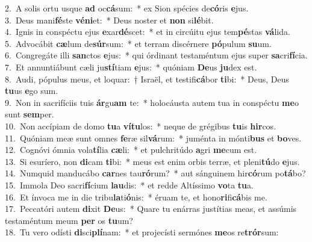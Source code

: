 {2.~}A solis ortu usque \textbf{ad} oc\textbf{cá}sum:~* ex Sion spécies de\textbf{có}ris \textbf{e}jus.\\
{3.~}Deus mani\textbf{fé}ste \textbf{vé}\textbf{ni}et:~* Deus noster et \textbf{non} si\textbf{lé}bit.\\
{4.~}Ignis in conspéctu ejus \textbf{e}xar\textbf{dé}scet:~* et in circúitu ejus tem\textbf{pé}stas \textbf{vá}lida.\\
{5.~}Advocábit \textbf{cæ}lum de\textbf{súr}sum:~* et terram discérnere \textbf{pó}pulum \textbf{su}um.\\
{6.~}Congregáte illi \textbf{san}ctos \textbf{e}jus:~* qui órdinant testaméntum ejus super \textbf{sa}cri\textbf{fí}cia.\\
{7.~}Et annuntiábunt cæli ju\textbf{stí}tiam \textbf{e}jus:~* quóniam \textbf{De}us \textbf{ju}dex est.\\
{8.~}Audi, pópulus meus, et loquar:~† Israël, et testifi\textbf{cá}bor \textbf{ti}bi:~* Deus, Deus \textbf{tu}us \textbf{e}go sum.\\
{9.~}Non in sacrifíciis tuis \textbf{ár}gu\textbf{am} te:~* holocáusta autem tua in conspéctu \textbf{me}o sunt \textbf{sem}per.\\
{10.~}Non accípiam de domo \textbf{tu}a \textbf{ví}\textbf{tu}los:~* neque de grégibus \textbf{tu}is \textbf{hir}cos.\\
{11.~}Quóniam meæ sunt omnes \textbf{fe}ræ sil\textbf{vá}rum:~* juménta in mónti\textbf{bus} et \textbf{bo}ves.\\
{12.~}Cognóvi ómnia vola\textbf{tí}lia \textbf{cæ}li:~* et pulchritúdo \textbf{a}gri \textbf{me}cum est.\\
{13.~}Si esuríero, non \textbf{di}cam \textbf{ti}bi:~* meus est enim orbis terræ, et pleni\textbf{tú}do \textbf{e}jus.\\
{14.~}Numquid manducábo \textbf{car}nes tau\textbf{ró}rum?~* aut sánguinem hir\textbf{có}rum po\textbf{tá}bo?\\
{15.~}Immola Deo sacri\textbf{fí}cium \textbf{lau}dis:~* et redde Altíssimo \textbf{vo}ta \textbf{tu}a.\\
{16.~}Et ínvoca me in die tribu\textbf{la}ti\textbf{ó}nis:~* éruam te, et hono\textbf{ri}fi\textbf{cá}bis me.\\
{17.~}Peccatóri autem \textbf{di}xit \textbf{De}us:~* Quare tu enárras justítias meas, et assúmis testaméntum meum \textbf{per} os \textbf{tu}um?\\
{18.~}Tu vero odísti \textbf{di}sci\textbf{plí}nam:~* et projecísti sermónes \textbf{me}os re\textbf{trór}sum:\\
